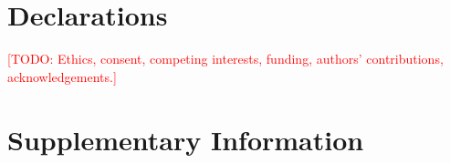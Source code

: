 \documentclass[11pt]{article}
\newcommand{\todo}[1]{\textcolor{red}{[TODO: #1]}}
\begin{document}
\section*{Declarations}
\todo{Ethics, consent, competing interests, funding, authors' contributions, acknowledgements.}




\clearpage
\appendix
\nolinenumbers
\singlespacing
\setcounter{figure}{0}\setcounter{table}{0}
\renewcommand{\thefigure}{S\arabic{figure}}
\renewcommand{\thetable}{S\arabic{table}}
\renewcommand{\figurename}{Supplementary Fig.}
\renewcommand{\tablename}{Supplementary Table}
\section*{Supplementary Information}

\end{document}
